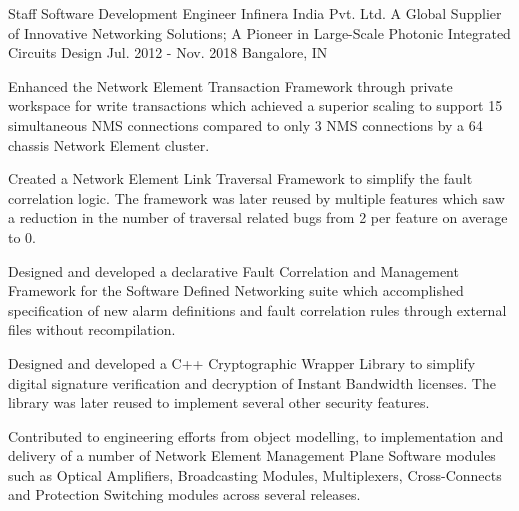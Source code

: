 \begin{cventries}
  \expentry
    {Staff Software Development Engineer} %
    {Infinera} {India Pvt. Ltd.} %
    {A Global Supplier of Innovative Networking Solutions; A Pioneer in Large-Scale Photonic Integrated Circuits Design} %
    {Jul. 2012 - Nov. 2018} %
    {Bangalore, IN} %
    {
      \begin{cvitems} %
      \item {Enhanced the Network Element Transaction Framework through private workspace for write transactions which achieved a superior scaling to support 15 simultaneous NMS connections compared to only 3 NMS connections by a 64 chassis Network Element cluster.}
      \item {Created a Network Element Link Traversal Framework to simplify the fault correlation logic. The framework was later reused by multiple features which saw a reduction in the number of traversal related bugs from 2 per feature on average to 0.}
      \item {Designed and developed a declarative Fault Correlation and Management Framework for the Software Defined Networking suite which accomplished specification of new alarm definitions and fault correlation rules through external files without recompilation.}
      \item {Designed and developed a C++ Cryptographic Wrapper Library to simplify digital signature verification and decryption of Instant Bandwidth licenses. The library was later reused to implement several other security features.}
      \item {Contributed to engineering efforts from object modelling, to implementation and delivery of a number of Network Element Management Plane Software modules such as Optical Amplifiers, Broadcasting Modules, Multiplexers, Cross-Connects and Protection Switching modules across several releases.}
      \end{cvitems}
    }


\end{cventries}
